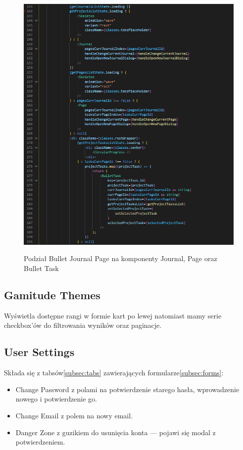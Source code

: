 \documentclass[a4paper,11pt]{report}
\begin{document}
\begin{figure}[H]
	\centering
	\includegraphics[scale=0.7]{implementacja/frontend/bullet_journal_division}\\
	\caption{Podział Bullet Journal Page na komponenty Journal, Page oraz Bullet Task}
	\label{fig:bullet_division}
\end{figure}

\subsection{Gamitude Themes}
Wyświetla dostępne rangi w formie kart po lewej natomiast mamy serie checkbox'ów do filtrowania wyników oraz paginacje.

\subsection{User Settings}
Składa się z tabsów\ref{subsec:tabs} zawierających formularze\ref{subsec:forms}:
\begin{itemize}
	\item Change Password z polami na potwierdzenie starego hasła, wprowadzenie nowego i potwierdzenie go.
	\item Change Email z polem na nowy email.
	\item Danger Zone z guzikiem do usunięcia konta — pojawi się modal z potwierdzeniem.
\end{itemize}
\end{document}
